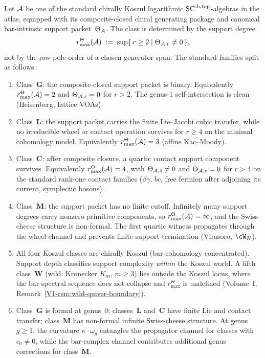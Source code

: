 \begin{theorem}
\label{thm:pole-structure-dichotomy}
Let\/ $\mathcal{A}$ be one of the standard chirally Koszul logarithmic
$\mathsf{SC}^{\mathrm{ch,top}}$-algebras in the atlas, equipped with its
composite-closed chiral generating package and canonical
bar-intrinsic support packet~$\Theta_{\mathcal{A}}$.  The class is determined
by the support degree
\[
r^\Theta_{\max}(\mathcal{A})
\;:=\;
\sup\{\,r\ge2\mid \Theta_{\mathcal{A},r}\ne0\,\},
\]
not by the raw pole order of a chosen generator span.  The standard
families split as follows:
\begin{enumerate}[label=\textup{(\roman*)}]
\item Class~$\mathbf{G}$: the composite-closed support packet is
 binary.  Equivalently \(r^\Theta_{\max}(\mathcal{A})=2\) and
 \(\Theta_{\mathcal{A},r}=0\) for \(r>2\).  The genus-$1$
 self-intersection is clean
 \textup{(}Heisenberg, lattice VOAs\textup{)}.
\item Class~$\mathbf{L}$: the support packet carries the finite
 Lie--Jacobi cubic transfer, while no irreducible wheel or contact
 operation survives for \(r\ge4\) on the minimal cohomology model.
 Equivalently \(r^\Theta_{\max}(\mathcal{A})=3\)
 \textup{(}affine Kac--Moody\textup{)}.
\item Class~$\mathbf{C}$: after composite closure, a quartic contact
 support component survives.  Equivalently
 \(r^\Theta_{\max}(\mathcal{A})=4\), with \(\Theta_{\mathcal{A},4}\ne0\) and
 \(\Theta_{\mathcal{A},r}=0\) for \(r>4\) on the standard rank-one contact
 families
 \textup{(}$\beta\gamma$, $bc$, free fermion after adjoining its
 current, symplectic bosons\textup{)}.
\item Class~$\mathbf{M}$: the support packet has no finite cutoff.
 Infinitely many support degrees carry nonzero primitive components,
 so \(r^\Theta_{\max}(\mathcal{A})=\infty\), and the Swiss-cheese structure is
 non-formal.  The first quartic witness propagates through the wheel
 channel and prevents finite support termination
 \textup{(}Virasoro, $\cW_N$\textup{)}.
\item All four Koszul classes are chirally Koszul \textup{(}bar
 cohomology concentrated\textup{)}. Support depth classifies
 support complexity \emph{within} the Koszul world. A fifth
 class~$\mathbf{W}$ \textup{(}wild: Kronecker $K_m$, $m \geq 3$\textup{)}
 lies outside the Koszul locus, where the bar spectral
 sequence does not collapse and \(r^\Theta_{\max}\) is undefined
 \textup{(}Volume~I, Remark~\textup{\ref*{V1-rem:wild-quiver-boundary}}\textup{)}.
\item \label{item:bar-channel} Class~$\mathbf{G}$ is formal at
 genus~$0$; classes~$\mathbf{L}$ and~$\mathbf{C}$ have finite
 Lie and contact transfer; class~$\mathbf{M}$ has non-formal
 infinite Swiss-cheese structure. At genus~$g \ge 1$, the
 curvature $\kappa \cdot \omega_g$ entangles the propagator
 channel for classes with $c_0 \ne 0$, while the bar-complex
 channel contributes additional genus corrections for
 class~$\mathbf{M}$.
\end{enumerate}
\end{theorem}

